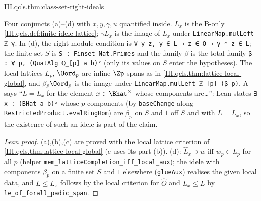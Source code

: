 \begin{theorem}
\end{theorem}
\begin{tfformal}{III.qcls.thm:class-set-right-ideals}
\begin{tffidelity}
Four conjuncts (a)--(d) with $x,y,\gamma,u$ quantified inside. $L_x$ is the B-only \cref{III.qcls.def:finite-idele-lattice}; $\gamma L_x$ is the image of $L_x$ under \texttt{LinearMap.mulLeft ℤ γ}. In (d), the right-module condition is \texttt{∀ y z, y ∈ L → z ∈ O → y * z ∈ L}; the finite set $S$ is \texttt{S : Finset Nat.Primes} and the family $\beta$ is the total family \texttt{β : ∀ p, (QuatAlg ℚ\_[p] a b)ˣ} (only its values on $S$ enter the hypotheses). The local lattices $L_p$, $\Oord_p$ are inline $\Zp$-spans as in \cref{III.qcls.thm:lattice-local-global}, and $\beta_p\Oord_p$ is the image under \texttt{LinearMap.mulLeft ℤ\_[p] (β p)}. A says ``$L=L_x$ for the element $x\in\Bhat^\times$ whose components are\dots'': Lean states \texttt{∃ x : (BHat a b)ˣ} whose $p$-components (by \texttt{baseChange} along \texttt{RestrictedProduct.evalRingHom}) are $\beta_p$ on $S$ and $1$ off $S$ and with $L=L_x$, so the existence of such an idele is part of the claim.
\end{tffidelity}
\end{tfformal}
\begin{proof}[Lean proof]
(a),(b),(c) are proved with the local lattice criterion of \cref{III.qcls.thm:lattice-local-global} (c uses its part (b)). (d): $\hat L_x\ni w$ iff $w_p\in L_p$ for all $p$ (helper \texttt{mem\_latticeCompletion\_iff\_local\_aux}); the idele with components $\beta_p$ on a finite set $S$ and $1$ elsewhere (\texttt{glueAux}) realises the given local data, and $L\le L_x$ follows by the local criterion for $\hat O$ and $L_x\le L$ by \texttt{le\_of\_forall\_padic\_span}.
\end{proof}

